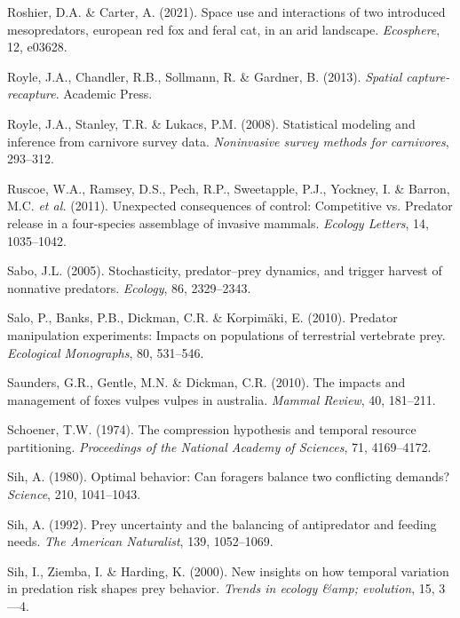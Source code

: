 \documentclass[11pt,a4paper,titlepage,twoside,openright]{style/unimelbthesis}
\begin{document}
\begin{mainmatter}
\leavevmode\hypertarget{ref-roshier2021space}{}%
Roshier, D.A. \& Carter, A. (2021). Space use and interactions of two introduced mesopredators, european red fox and feral cat, in an arid landscape. \emph{Ecosphere}, 12, e03628.

\leavevmode\hypertarget{ref-royle2013spatial}{}%
Royle, J.A., Chandler, R.B., Sollmann, R. \& Gardner, B. (2013). \emph{Spatial capture-recapture}. Academic Press.

\leavevmode\hypertarget{ref-royle2008statistical}{}%
Royle, J.A., Stanley, T.R. \& Lukacs, P.M. (2008). Statistical modeling and inference from carnivore survey data. \emph{Noninvasive survey methods for carnivores}, 293--312.

\leavevmode\hypertarget{ref-ruscoe2011unexpected}{}%
Ruscoe, W.A., Ramsey, D.S., Pech, R.P., Sweetapple, P.J., Yockney, I. \& Barron, M.C. \emph{et al.} (2011). Unexpected consequences of control: Competitive vs. Predator release in a four-species assemblage of invasive mammals. \emph{Ecology Letters}, 14, 1035--1042.

\leavevmode\hypertarget{ref-sabo2005stochasticity}{}%
Sabo, J.L. (2005). Stochasticity, predator--prey dynamics, and trigger harvest of nonnative predators. \emph{Ecology}, 86, 2329--2343.

\leavevmode\hypertarget{ref-salo2010predator}{}%
Salo, P., Banks, P.B., Dickman, C.R. \& Korpimäki, E. (2010). Predator manipulation experiments: Impacts on populations of terrestrial vertebrate prey. \emph{Ecological Monographs}, 80, 531--546.

\leavevmode\hypertarget{ref-saunders2010impacts}{}%
Saunders, G.R., Gentle, M.N. \& Dickman, C.R. (2010). The impacts and management of foxes vulpes vulpes in australia. \emph{Mammal Review}, 40, 181--211.

\leavevmode\hypertarget{ref-schoener1974compression}{}%
Schoener, T.W. (1974). The compression hypothesis and temporal resource partitioning. \emph{Proceedings of the National Academy of Sciences}, 71, 4169--4172.

\leavevmode\hypertarget{ref-sih1980optimal}{}%
Sih, A. (1980). Optimal behavior: Can foragers balance two conflicting demands? \emph{Science}, 210, 1041--1043.

\leavevmode\hypertarget{ref-sih1992prey}{}%
Sih, A. (1992). Prey uncertainty and the balancing of antipredator and feeding needs. \emph{The American Naturalist}, 139, 1052--1069.

\leavevmode\hypertarget{ref-sih2000new}{}%
Sih, I., Ziemba, I. \& Harding, K. (2000). New insights on how temporal variation in predation risk shapes prey behavior. \emph{Trends in ecology \&amp; evolution}, 15, 3---4.


\end{mainmatter}
\end{document}
